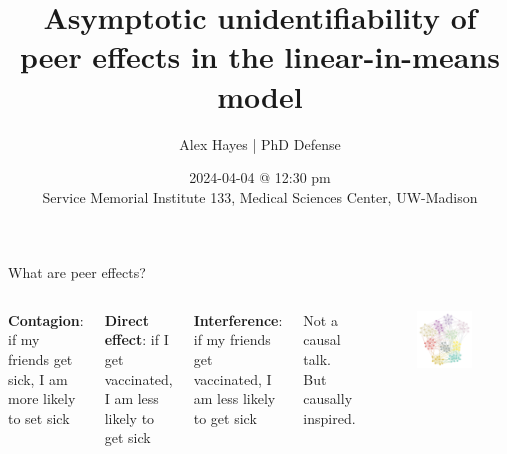 \documentclass[aspectratio=169]{beamer}
\title{Asymptotic unidentifiability of peer effects in the linear-in-means model}
\date{2024-04-04 @ 12:30 pm\\ Service Memorial Institute 133, Medical Sciences Center, UW-Madison}
\author{Alex Hayes | PhD Defense}
\institute{Department of Statistics, University of Wisconsin-Madison}
\theoremstyle{remark}
\begin{document}
\maketitle


\begin{frame}{What are peer effects?}
    \begin{columns}
        \vspace{7mm}
        
        \textbf{Contagion}: if my friends get sick, I am more likely to set sick
        
        \vspace{4mm}
        
        \textbf{Direct effect}: if I get vaccinated, I am less likely to get sick
        
        \vspace{4mm}
        
        \textbf{Interference}: if my friends get vaccinated, I am less likely to get sick
        
        \vspace{7mm}
        
        {\footnotesize * Not a causal talk. But causally inspired.}
        
        \begin{figure}[ht]
            \centering
            \includegraphics[width=\textwidth]{figures/assortative.png}
        \end{figure}
    \end{columns}
\end{frame}
\end{document}

